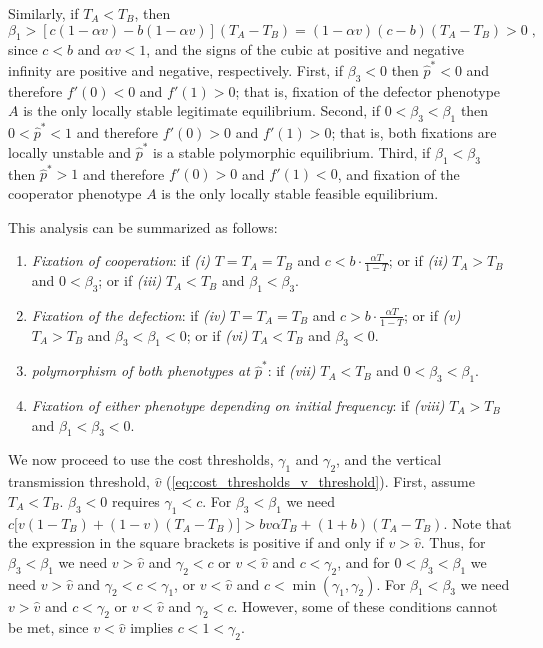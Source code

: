 \documentclass[12pt]{extarticle}
\begin{document}
\begin{appendices}
Similarly, if $T_A<T_B$, then
\begin{equation} \label{eq:beta1_rev}
   \beta_1 > [c(1-\alpha v) - b(1-\alpha v)] (T_A-T_B) 
   = (1-\alpha v)(c-b)(T_A-T_B) > 0 \;,
 \end{equation}
since $c<b$ and $\alpha v < 1$, and the signs of the cubic at positive and negative infinity are positive and negative, respectively. 
First, if $\beta_3<0$ then $\hat{p}^*<0$ and therefore $f'(0)<0$ and $f'(1)>0$; that is, fixation of the defector phenotype $A$ is the only locally stable legitimate equilibrium.
Second, if $0<\beta_3<\beta_1$ then $0<\hat{p}^*<1$ and therefore $f'(0)>0$ and $f'(1)>0$; that is, both fixations are locally unstable and $\hat{p}^*$ is a stable polymorphic equilibrium.
Third, if $\beta_1<\beta_3$ then $\hat{p}^*>1$ and therefore $f'(0)>0$ and $f'(1)<0$, and fixation of the cooperator phenotype $A$ is the only locally stable feasible equilibrium.

This analysis can be summarized as follows:
\begin{enumerate}
\item \emph{Fixation of cooperation}: 
	if \emph{(i)} $T=T_A=T_B$ and $c < b\cdot \frac{\alpha T}{1-T}$; or
	if \emph{(ii)} $T_A>T_B$ and $0<\beta_3$; or 
	if \emph{(iii)} $T_A<T_B$ and $\beta_1<\beta_3$.
\item \emph{Fixation of the defection}: 
	if \emph{(iv)}  $T=T_A=T_B$ and $c > b\cdot \frac{\alpha T}{1-T}$; or 
	if \emph{(v)} $T_A>T_B$ and $\beta_3<\beta_1<0$; or 
	if \emph{(vi)} $T_A<T_B$ and $\beta_3<0$.
\item \emph{polymorphism of both phenotypes at $\hat{p}^*$}: 
	if \emph{(vii)} $T_A < T_B$ and $0<\beta_3<\beta_1$.
\item \emph{Fixation of either phenotype depending on initial frequency}:
	if \emph{(viii)}  $T_A>T_B$ and $\beta_1<\beta_3<0$.
\end{enumerate}

We now proceed to use the cost thresholds, $\gamma_1$ and $\gamma_2$, and the vertical transmission threshold, $\hat v$ (\autoref{eq:cost_thresholds_v_threshold}).
First, assume $T_A<T_B$.
$\beta_3<0$ requires $\gamma_1<c$.
For $\beta_3<\beta_1$ we need $c\big[v(1-T_B) + (1-v)(T_A-T_B)\big] > bv\alpha T_B + (1+b)(T_A-T_B)$.
Note that the expression in the square brackets is positive if and only if $v > \hat v$.
Thus, for $\beta_3<\beta_1$ we need $v > \hat v$ and $\gamma_2 < c$ or $v < \hat v$ and $c < \gamma_2$,
and for $0<\beta_3<\beta_1$ we need $v > \hat v$ and $\gamma_2 < c < \gamma_1$, or $v < \hat v$ and $c < \min(\gamma_1, \gamma_2)$. For $\beta_1<\beta_3$ we need $v > \hat v$ and $c<\gamma_2$ or $v < \hat v$ and $\gamma_2<c$.
However, some of these conditions cannot be met, since $v < \hat v$ implies $c<1<\gamma_2$.


\end{appendices}
\end{document}
